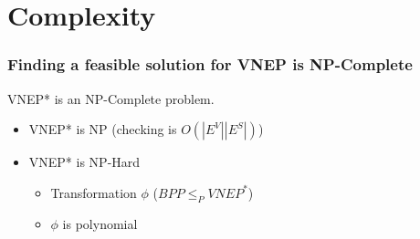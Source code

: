 \documentclass[english]{beamer}
\begin{document}
\section{Complexity}
\begin{frame}
\frametitle{Finding a feasible solution for VNEP is NP-Complete}
\pause
\begin{theorem} \label{th:npcomplete}
  VNEP* is an NP-Complete problem.
\end{theorem}

\begin{itemize}
  \item VNEP* is NP (checking is $O(|E^V||E^S|)$)
  \item VNEP* is NP-Hard
  \begin{itemize}
    \item Transformation $\phi$ ($BPP\le_P VNEP^*$)
    \item $\phi$ is polynomial
  \end{itemize}
\end{itemize}
\end{frame}

\end{document}
